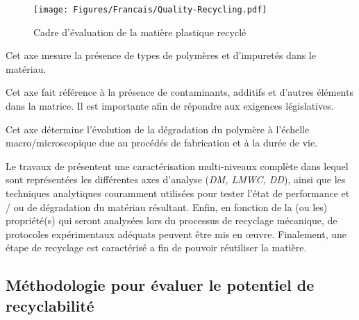 \begin{minipage}[p]{0.48\textwidth}
	\begin{figure}[H]
		\flushleft
		\texttt{[image: Figures/Francais/Quality-Recycling.pdf]}
		\caption[]{Cadre d'évaluation de la matière plastique recyclé}
		\label{Fig:Quality.Recycling.Francais}
	\end{figure}	
\end{minipage}
\begin{minipage}[p]{0.48\textwidth}
	\begin{footnotesize}
		\begin{description}[noitemsep]
			\item[\textit{Degré de Mélange (DM):}]
			Cet axe mesure la présence de types de polymères et d'impuretés dans le matériau.
			
			\item [\textit{Composés de bas poids moléculaire (LMWC):}]
			Cet axe fait référence à la présence de contaminants, additifs et d'autres éléments dans la matrice.
			Il est importante afin de répondre aux exigences législatives.
			
			\item [\textit{Degré de dégradation (DD):}] 
			
			Cet axe détermine l'évolution de la dégradation du polymère à l'échelle macro/microscopique due au procédés de fabrication et à la durée de vie.
		\end{description}
	\end{footnotesize}
\end{minipage}


Le travaux de \textcite{Badia2016} présentent une caractérisation multi-niveaux complète dans lequel sont représentées les différentes axes d'analyse (\textit{DM, LMWC, DD}), ainsi que les techniques analytiques couramment utilisées pour tester l'état de performance et / ou de dégradation du matériau résultant.
Enfin, en fonction de la (ou les) propriété(s) qui seront analysées lors du processus de recyclage mécanique,
de protocoles expérimentaux adéquats peuvent être mis en œuvre.
Finalement, une étape de recyclage est caractérisé a fin de pouvoir réutiliser la matière.




\subsection*{Méthodologie pour évaluer le potentiel de recyclabilité}

